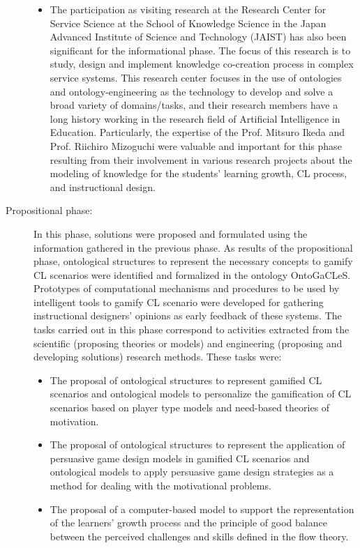 \begin{description}
\begin{itemize}
\item
The participation as visiting research at the Research Center for Service Science at the School of Knowledge Science in the Japan Advanced Institute of Science and Technology (JAIST) has also been significant for the informational phase.
The focus of this research is to study, design and implement knowledge co-creation process in complex service systems.
This research center focuses in the use of ontologies and ontology-engineering as the technology to develop and solve a broad variety of domains/tasks, and their research members have a long history working in the research field of Artificial Intelligence in Education.
Particularly, the expertise of the Prof. Mitsuro Ikeda and Prof. Riichiro Mizoguchi were valuable and important for this phase resulting from their involvement in various research projects about the modeling of knowledge for the students' learning growth, CL process, and instructional design.
\end{itemize}

\item[Propositional phase:]
In this phase, solutions were proposed and formulated using the information gathered in the previous phase.
As results of the propositional phase, ontological structures to represent the necessary concepts to gamify CL scenarios were identified and formalized in the ontology OntoGaCLeS.
Prototypes of computational mechanisms and procedures to be used by intelligent tools to gamify CL scenario were developed for gathering instructional designers' opinions as early feedback of these systems.
The tasks carried out in this phase correspond to activities extracted from the scientific (proposing theories or models) and engineering (proposing and developing solutions) research methods.
These tasks were:

\begin{itemize}
\item
The proposal of ontological structures to represent gamified CL scenarios and ontological models to personalize the gamification of CL scenarios based on player type models and need-based theories of motivation.

\item
The proposal of ontological structures to represent the application of persuasive game design models in gamified CL scenarios and ontological models to apply persuasive game design strategies as a method for dealing with the motivational problems.

\item
The proposal of a computer-based model to support the representation of the learners' growth process and the principle of good balance between the perceived challenges and skills defined in the flow theory.



\end{itemize}
\end{description}
